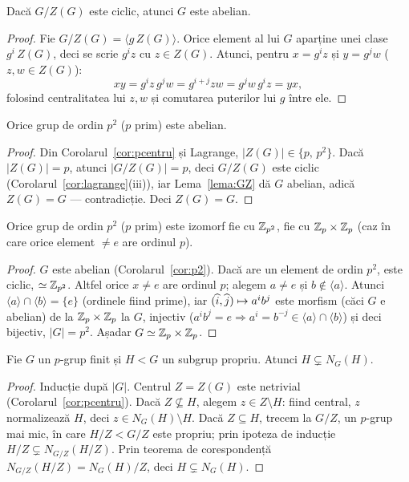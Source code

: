 \begin{lema}\label{lema:GZ}
Dacă $G/Z(G)$ este ciclic, atunci $G$ este abelian.
\end{lema}

\begin{proof}
Fie $G/Z(G)=\langle g\,Z(G)\rangle$. Orice element al lui $G$ aparține unei clase $g^i\,Z(G)$, deci se scrie $g^iz$ cu $z\in Z(G)$. Atunci, pentru $x=g^iz$ și $y=g^jw$ ($z,w\in Z(G)$):
\[
xy=g^iz\,g^jw=g^{i+j}zw=g^jw\,g^iz=yx,
\]
folosind centralitatea lui $z,w$ și comutarea puterilor lui $g$ între ele.
\end{proof}

\begin{corolar}\label{cor:p2}
Orice grup de ordin $p^2$ ($p$ prim) este abelian.
\end{corolar}

\begin{proof}
Din Corolarul~\ref{cor:pcentru} și Lagrange, $|Z(G)|\in\{p,\,p^2\}$. Dacă $|Z(G)|=p$, atunci $|G/Z(G)|=p$, deci $G/Z(G)$ este ciclic (Corolarul~\ref{cor:lagrange}(iii)), iar Lema~\ref{lema:GZ} dă $G$ abelian, adică $Z(G)=G$ --- contradicție. Deci $Z(G)=G$.
\end{proof}

\begin{propozitie}\label{prop:ordp2struct}
Orice grup de ordin $p^2$ ($p$ prim) este izomorf fie cu $\mathbb{Z}_{p^2}$, fie cu $\mathbb{Z}_p\times\mathbb{Z}_p$ (caz în care orice element $\neq e$ are ordinul $p$).
\end{propozitie}

\begin{proof}
$G$ este abelian (Corolarul~\ref{cor:p2}). Dacă are un element de ordin $p^2$, este ciclic, $\simeq\mathbb{Z}_{p^2}$. Altfel orice $x\neq e$ are ordinul $p$; alegem $a\neq e$ și $b\notin\langle a\rangle$. Atunci $\langle a\rangle\cap\langle b\rangle=\{e\}$ (ordinele fiind prime), iar $(\widehat{i},\widehat{j})\mapsto a^ib^j$ este morfism (căci $G$ e abelian) de la $\mathbb{Z}_p\times\mathbb{Z}_p$ la $G$, injectiv ($a^ib^j=e\Rightarrow a^i=b^{-j}\in\langle a\rangle\cap\langle b\rangle$) și deci bijectiv, $|G|=p^2$. Așadar $G\simeq\mathbb{Z}_p\times\mathbb{Z}_p$.
\end{proof}

\begin{lema}\label{lema:normcreste}
Fie $G$ un $p$-grup finit și $H<G$ un subgrup propriu. Atunci $H\subsetneq N_G(H)$.
\end{lema}
\begin{proof}
Inducție după $|G|$. Centrul $Z=Z(G)$ este netrivial (Corolarul~\ref{cor:pcentru}). Dacă $Z\not\subseteq H$, alegem $z\in Z\setminus H$: fiind central, $z$ normalizează $H$, deci $z\in N_G(H)\setminus H$. Dacă $Z\subseteq H$, trecem la $G/Z$, un $p$-grup mai mic, în care $H/Z<G/Z$ este propriu; prin ipoteza de inducție $H/Z\subsetneq N_{G/Z}(H/Z)$. Prin teorema de corespondență $N_{G/Z}(H/Z)=N_G(H)/Z$, deci $H\subsetneq N_G(H)$.
\end{proof}

